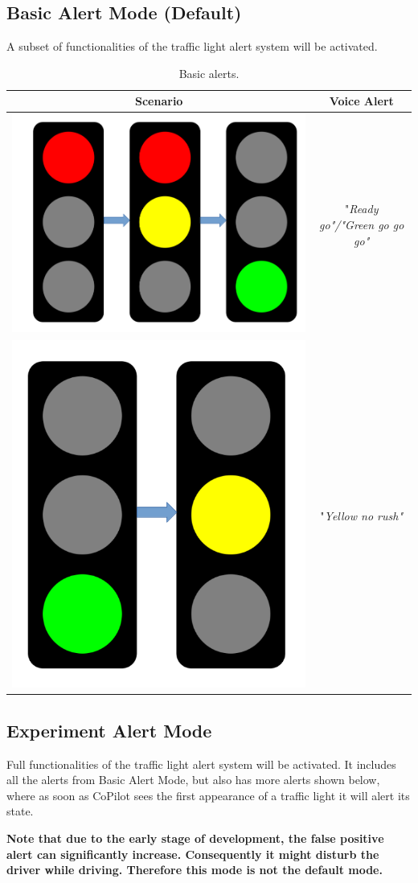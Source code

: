\documentclass[a4paper]{manual}
\begin{document}
\subsection{Basic Alert Mode (Default)}
A subset of functionalities of the traffic light alert system will be activated.
\begin{table}[ht]
\caption{Basic alerts.}
\centering
\begin{tabular}{c|c}
\hline
    Scenario & Voice Alert \\
\hline
    \includegraphics[height=0.15\textwidth]{pics/red_to_green.png} &  "\emph{Ready go"/"Green go go go"}  \\
\hline
     \includegraphics[height=0.15\textwidth]{pics/green_to_yellow.png} &  "\emph{Yellow no rush"} \\
\hline
\end{tabular}
\label{tab:gt}
\end{table}

\clearpage
\subsection{Experiment Alert Mode}
Full functionalities of the traffic light alert system will be activated. It includes all the alerts from Basic Alert Mode, but also has more alerts shown below, where as soon as CoPilot
sees the first appearance of a traffic light it will alert its state.

\textbf{Note that due to the early stage of development, the false positive alert can significantly increase. Consequently it might disturb the driver while driving. Therefore this mode is not the default mode.}
\end{document}

